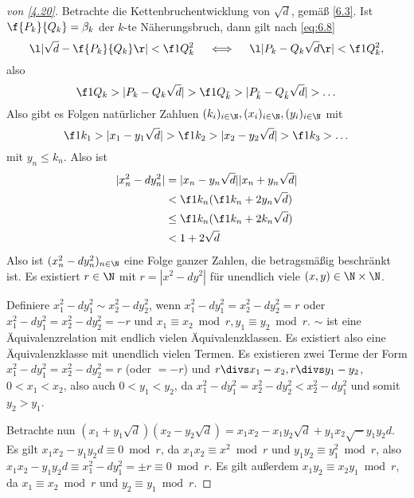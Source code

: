 \begin{proof}[von \ref{4.20}]
	Betrachte die Kettenbruchentwicklung von $\sqrt d$, gemäß \ref{6.3}.
	Ist $\f {P_k}{Q_k} = \beta_k$ der $k$-te Näherungsbruch, dann gilt nach \eqref{eq:6.8}
	\[
		\l| \sqrt d - \f{P_k}{Q_k}\r| < \f 1{Q_k^2}
		\quad\iff\quad
		\l| P_k - Q_k \sqrt d\r| < \f 1{Q_k^2},
	\]
	also
	\[
		\f 1{Q_k}
		> | P_k - Q_k \sqrt d|
		> \f 1{Q_{\tilde k}}
		> | P_{\tilde k} - Q_{\tilde k} \sqrt d|
		> \dotso
	\]
	Also gibt es Folgen natürlicher Zahluen $(k_i)_{i\in\N}, (x_i)_{i\in\N}, (y_i)_{i\in\N}$ mit
	\[
		\f 1{k_1}
		> |x_1 - y_1 \sqrt d|
		> \f 1{k_2}
		> |x_2 - y_2 \sqrt d|
		> \f 1{k_3}
		> \dotso
	\]
	mit $y_n \le k_n$.
	Also ist
	\begin{align*}
		|x_n^2 - dy_n^2|
		&= |x_n - y_n \sqrt d| |x_n + y_n \sqrt d|  \\
		&< \f 1{k_n} (\f 1{k_n} + 2 y_n \sqrt d)  \\
		&\le \f 1{k_n} (\f 1{k_n} + 2k_n \sqrt d)  \\
		&< 1 + 2 \sqrt d
	\end{align*}
	Also ist $(x_n^2 - dy_n^2)_{n\in \N}$ eine Folge ganzer Zahlen, die betragsmäßig beschränkt ist.
	Es existiert $r \in \N$ mit $r = |x^2 - dy^2|$ für unendlich viele $(x,y)  \in \N \times \N$.

	Definiere $x_1^2 - dy_1^2 \sim x_2^2 - dy_2^2$, wenn $x_1^2 - dy_1^2 = x_2^2 - dy_2^2 = r$ oder $x_1^2 - dy_1^2 = x_2^2 - dy_2^2 = -r$ und $x_1 \equiv x_2 \bmod r, y_1 \equiv y_2 \bmod r$.
	$\sim$ ist eine Äquivalenzrelation mit endlich vielen Äquivalenzklassen.
	Es existiert also eine Äquivalenzklasse mit unendlich vielen Termen.
	Es existieren zwei Terme der Form $x_1^2 - dy_1^2 = x_2^2 - dy_2^2 = r$ (oder $= -r$) und $r \divs x_1 - x_2, r\divs y_1 - y_2$, \oBdA $0 < x_1 < x_2$, also auch $0 < y_1 < y_2$, da $x_1^2 - dy_1^2 = x_2^2 - dy_2^2 < x_2^2 - dy_1^2$ und somit $y_2 > y_1$.

	Betrachte nun $(x_1 + y_1 \sqrt d)(x_2 - y_2 \sqrt d) = x_1x_2 - x_1y_2 \sqrt d + y_1 x_2 \sqrt - y_1 y_2 d$.
	Es gilt $x_1 x_2 - y_1 y_2 d \equiv 0 \bmod r$, da $x_1 x_2 \equiv x^2 \bmod r$ und $y_1 y_2 \equiv y_1^2 \bmod r$, also $x_1 x_2 - y_1 y_2 d \equiv x_1^2 - dy_1^2 = \pm r \equiv 0 \bmod r$.
	Es gilt außerdem $x_1 y_2 \equiv x_2 y_1 \bmod r$, da $x_1 \equiv x_2 \bmod r$ und $y_2 \equiv y_1 \bmod r$.


\end{proof}
